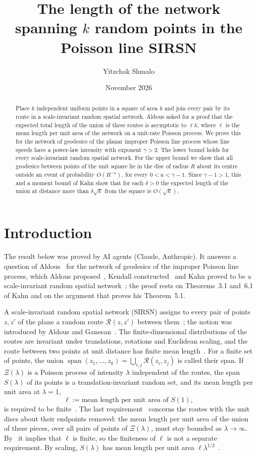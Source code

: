 \documentclass[11pt]{amsart}
\title[Span length in the Poisson line SIRSN]{The length of the network spanning $k$ random points in the
Poisson line SIRSN}
\author{Yitzchak Shmalo}
\date{November 2026}
\theoremstyle{remark}
\newcommand{\spn}{\operatorname{span}}
\begin{document}
\begin{abstract}
Place $k$ independent uniform points in a square of area $k$ and join every pair by its route in a scale-invariant
random spatial network. Aldous asked for a proof that the expected total length of the union of these routes is
asymptotic to $\ell k$, where $\ell$ is the mean length per unit area of the network on a unit-rate Poisson process. We
prove this for the network of geodesics of the planar improper Poisson line process whose line speeds have a power-law
intensity with exponent $\gamma>2$. The lower bound holds for every scale-invariant random spatial network. For the upper bound we show that all
geodesics between points of the unit square lie in the disc of radius $R$ about its centre outside an event of
probability $O(R^{-a})$, for every $0<a<\gamma-1$. Since $\gamma-1>1$, this and a moment bound of Kahn show that for each
$\delta>0$ the expected length of the union at distance more than $\delta\sqrt k$ from the square is $O(\sqrt k)$.
\end{abstract}
\maketitle

\section{Introduction}\label{sec:intro}

The result below was proved by AI agents (Claude, Anthropic). It answers a question of Aldous~\cite{Aldous} for the
network of geodesics of the improper Poisson line process, which Aldous proposed~\cite[Section~4.1]{Aldous}, Kendall
constructed~\cite{Kendall} and Kahn proved to be a scale-invariant random spatial network~\cite{Kahn}; the proof rests
on Theorems~3.1 and~6.1 of Kahn and on the argument that proves his Theorem~5.1.

A scale-invariant random spatial network (SIRSN) assigns to every pair of points $z,z'$ of the plane a random route
$\mathcal R(z,z')$ between them~\cite[Section~2.2]{Aldous}; the notion was introduced by Aldous and
Ganesan~\cite{AG}. The finite-dimensional distributions of the routes are
invariant under translations, rotations and Euclidean scaling, and the route between two points at unit distance has
finite mean length~\cite[(15)]{Aldous}. For a finite set of points, the union
$\spn(z_1,\dots,z_k)=\bigcup_{i,j}\mathcal R(z_i,z_j)$ is called their span. If $\Xi(\lambda)$ is a Poisson process of
intensity $\lambda$ independent of the routes, the span $S(\lambda)$ of its points is a translation-invariant random
set, and its mean length per unit area at $\lambda=1$,
\[
\ell:=\text{mean length per unit area of } S(1),
\]
is required to be finite~\cite[(16)]{Aldous}. The last requirement~\cite[(17)--(20)]{Aldous} concerns the
routes with the unit discs about their endpoints removed: the mean length per unit area of the union of these pieces,
over all pairs of points of $\Xi(\lambda)$, must stay bounded as $\lambda\to\infty$. By~\cite[Lemma~20]{Aldous} it
implies that $\ell$ is finite, so the finiteness of $\ell$ is not a separate requirement. By scaling, $S(\lambda)$ has mean length per unit area
$\ell\lambda^{1/2}$~\cite[(12)]{Aldous}.
\end{document}
